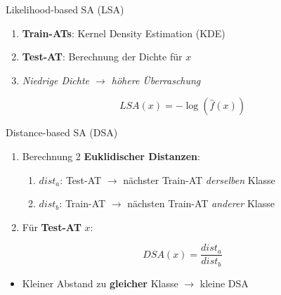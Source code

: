 \documentclass[usenames, dvipsnames, aspectratio=32]{beamer}
\begin{document}
\begin{frame}{Likelihood-based SA (LSA)}
    \begin{enumerate}
        \item \textbf{Train-ATs}: Kernel Density Estimation (KDE)
        \item \textbf{Test-AT}: Berechnung der Dichte für $x$
        \item \textit{Niedrige Dichte $\to$ höhere Überraschung} %
    \end{enumerate}
        \vspace{1em}
        $$LSA(x) = -\log(\hat{f}(x))$$
\end{frame}

\begin{frame}{Distance-based SA (DSA)}
    \begin{enumerate}
        \item Berechnung 2 \textbf{Euklidischer Distanzen}: %
        \begin{enumerate}
            \item $dist_a$: Test-AT $\to$ nächster Train-AT \textit{derselben} Klasse \vspace{.3em}
            \item $dist_b$: Train-AT $\to$ nächsten Train-AT \textit{anderer} Klasse \vspace{.2em}
        \end{enumerate}
        \item Für \textbf{Test-AT} $x$: 
    \end{enumerate}
    $$DSA(x) = \frac{dist_a}{dist_b}$$ \vspace{-.2em}
    \begin{itemize}
        \item Kleiner Abstand zu \textbf{gleicher} Klasse $\to$ kleine DSA %
    \end{itemize}
\end{frame}
\end{document}
